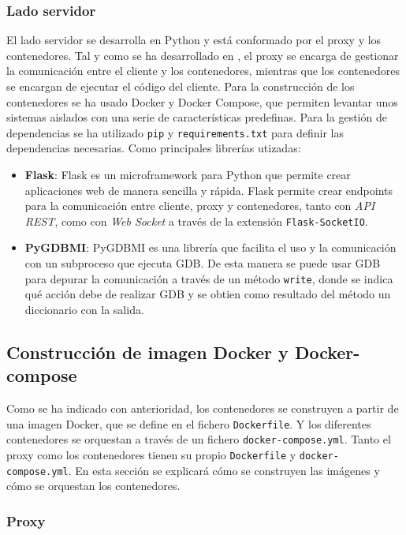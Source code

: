 \subsubsection{Lado servidor}
El lado servidor se desarrolla en Python y está conformado por el proxy y los contenedores. Tal y como se ha desarrollado en , el proxy se encarga de gestionar la comunicación entre el cliente y los contenedores, mientras que los contenedores se encargan de ejecutar el código del cliente. 
Para la construcción de los contenedores se ha usado Docker y Docker Compose, que permiten levantar unos sistemas aislados con una serie de características predefinas.
Para la gestión de dependencias se ha utilizado \texttt{pip} y \texttt{requirements.txt} para definir las dependencias necesarias. 
Como principales librerías utizadas:
\begin{itemize}
    \item \textbf{Flask}: Flask es un microframework para Python que permite crear aplicaciones web de manera sencilla y rápida. Flask permite crear endpoints para la comunicación entre cliente, proxy y contenedores, tanto con \textit{API REST}, como con \textit{Web Socket} a través de la extensión \texttt{Flask-SocketIO}.
    \item \textbf{PyGDBMI}: PyGDBMI es una librería que facilita el uso y la comunicación con un subproceso que ejecuta GDB. De esta manera se puede usar GDB para depurar la comunicación a través de un método \texttt{write}, donde se indica qué acción debe de realizar GDB y se obtien como resultado del método un diccionario con la salida. 
\end{itemize}

\subsection{Construcción de imagen Docker y Docker-compose} \label{subsec:construccion_imagen_docker}

Como se ha indicado con anterioridad, los contenedores se construyen a partir de una imagen Docker, que se define en el fichero \texttt{Dockerfile}. Y los diferentes contenedores se orquestan a través de un fichero \texttt{docker-compose.yml}. Tanto el proxy como los contenedores tienen su propio \texttt{Dockerfile} y \texttt{docker-compose.yml}. En esta sección se explicará cómo se construyen las imágenes y cómo se orquestan los contenedores.

\subsubsection{Proxy}

